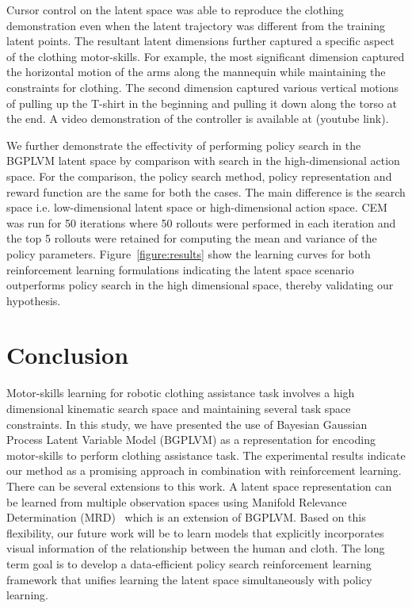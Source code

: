\documentclass{article}
\begin{document}
Cursor control on the latent space was able to reproduce the clothing demonstration even when the latent trajectory was different from the training latent points. The resultant latent dimensions further captured a specific aspect of the clothing motor-skills. For example, the most significant dimension captured the horizontal motion of the arms along the mannequin while maintaining the constraints for clothing. The second dimension captured various vertical motions of pulling up the T-shirt in the beginning and pulling it down along the torso at the end. A video demonstration of the controller is available at (youtube link).

We further demonstrate the effectivity of performing policy search in the BGPLVM latent space by comparison with search in the high-dimensional action space. For the comparison, the policy search method, policy representation and reward function are the same for both the cases. The main difference is the search space i.e. low-dimensional latent space or high-dimensional action space. CEM was run for 50 iterations where 50 rollouts were performed in each iteration and the top 5 rollouts were retained for computing the mean and variance of the policy parameters. Figure~\ref{figure:results} show the learning curves for both reinforcement learning formulations indicating the latent space scenario outperforms policy search in the high dimensional space, thereby validating our hypothesis.

\section{Conclusion}
\label{section:conclusion}

Motor-skills learning for robotic clothing assistance task involves a high dimensional kinematic search space and maintaining several task space constraints. In this study, we have presented the use of Bayesian Gaussian Process Latent Variable Model (BGPLVM) as a representation for encoding motor-skills to perform clothing assistance task. The experimental results indicate our method as a promising approach in combination with reinforcement learning. There can be several extensions to this work. A latent space representation can be learned from multiple observation spaces using Manifold Relevance Determination (MRD)~\cite{mrd} which is an extension of BGPLVM. Based on this flexibility, our future work will be to learn models that explicitly incorporates visual information of the relationship between the human and cloth. The long term goal is to develop a data-efficient policy search reinforcement learning framework that unifies learning the latent space simultaneously with policy learning.
\end{document}
